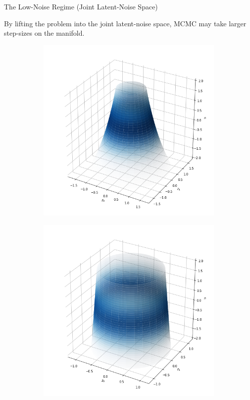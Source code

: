 \documentclass[10pt]{beamer}
\begin{document}
\begin{frame}[fragile]{The Low-Noise Regime (Joint Latent-Noise Space)}

    By lifting the problem into the joint latent-noise space, MCMC may take \alert{larger step-sizes} on the manifold.


    \begin{figure}
        \begin{subfigure}[b]{0.32\textwidth}
            \includegraphics[width=\textwidth]{m_high_noise.png}
        \end{subfigure}%
        \begin{subfigure}[b]{0.32\textwidth}
            \includegraphics[width=\textwidth]{m_mid_noise.png}

\end{subfigure}
\end{figure}
\end{frame}
\end{document}
